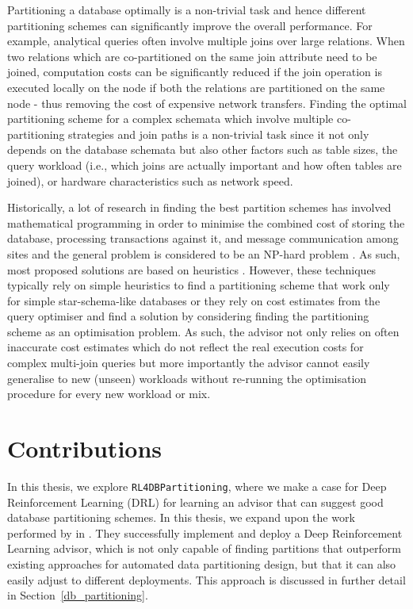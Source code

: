 Partitioning a database optimally is a non-trivial task and hence different partitioning schemes can significantly improve the overall performance. For example, analytical queries often involve multiple joins over large relations. When two relations which are co-partitioned on the same join attribute need to be joined, computation costs can be significantly reduced if the join operation is executed locally on the node if both the relations are partitioned on the same node - thus removing the cost of expensive network  transfers. Finding the optimal partitioning scheme for a complex schemata which involve multiple co-partitioning strategies and join paths is a non-trivial task since it not only depends on the database schemata but also other factors such as table sizes, the query workload (i.e., which joins are actually important and how often tables are joined), or hardware characteristics such as network speed. 

Historically, a lot of research in finding the best partition schemes has involved mathematical programming in order to minimise the combined cost of storing the database, processing transactions against it, and message communication among sites and the general problem is considered to be an NP-hard problem \cite{ozsu2011principles}. As such, most proposed solutions are based on heuristics \cite{navathe1984vertical, agrawal2004integrating, agrawal2006automatic, bruno2007online, bruno2008constrained, kimura2010coradd, ozmen2010workload, curino2010schism, quamar2013sword, DBLP:conf/sigmod/ZhouBL12, DBLP:conf/sigmod/NehmeB11}. However, these techniques typically rely on simple heuristics to find a partitioning scheme that work only for simple star-schema-like databases or they rely on cost estimates from the query optimiser and find a solution by considering finding the partitioning scheme as an optimisation problem. As such, the advisor not only relies on often inaccurate cost estimates which do not reflect the real execution costs for complex multi-join queries but more importantly the advisor cannot easily generalise to new (unseen) workloads without re-running the optimisation procedure for every new workload or mix. 
\section{Contributions}
\label{contribs}
In this thesis, we explore \texttt{RL4DBPartitioning}, where we make a case for Deep Reinforcement Learning (DRL) for learning an advisor that can suggest good database partitioning schemes. In this thesis, we expand upon the work performed by \citeauthor{Hilprecht:2019:TLP:3329859.3329876} in \cite{Hilprecht:2019:TLP:3329859.3329876}. They successfully implement and deploy a Deep Reinforcement Learning advisor, which is not only capable of finding partitions that outperform existing approaches for automated data partitioning design, but that it can also easily adjust to different deployments. This approach is discussed in further detail in Section~\ref{db_partitioning}. 

